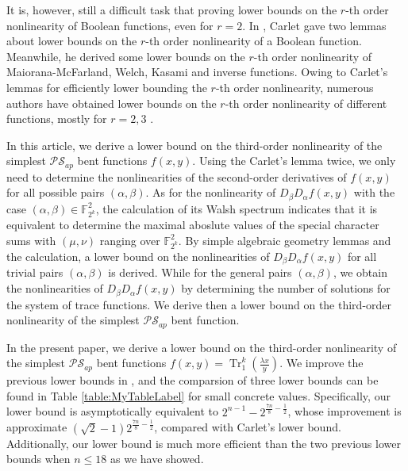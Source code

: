 \documentclass{article}
\newcommand{\F}{\mathbb{F}}
\newcommand{\0}{\textbf{0}}
\newcommand{\1}{\textbf{1}}
\newcommand{\TRACE}{\operatorname{Tr}_1^k}
\theoremstyle{plain}
\begin{document}
    It is, however, still a difficult task that proving lower bounds on the $r$-th order nonlinearity of Boolean functions, even for $r=2$. 
    In \cite{Carlet2008lowbound_NL_profile}, Carlet gave two lemmas about lower bounds on the $r$-th order nonlinearity of a Boolean function. 
    Meanwhile, he derived some lower bounds on the $r$-th order nonlinearity of Maiorana-McFarland, Welch, Kasami and inverse functions. 
    Owing to Carlet's lemmas for efficiently lower bounding the $r$-th order nonlinearity, numerous authors have obtained lower bounds on the $r$-th order nonlinearity of different functions, mostly for $r=2,3$ \cite{YanT2020NL_2,Liu2023NL_2,TangYZZ2020NL_2bent,SihemKJ2020NL_2cubic,SunW2009NL_2,SarkarG2009NL_2MM,GangopadhyayST2010NL_2,GodeG2010NL_3Kasami,SunW2011NL_2,TangCT2013NL_2bent,Singh2014NL_3_biquadratic,GaoT2017NL_2_MM}. 

    In this article, we derive a lower bound on the third-order nonlinearity of the simplest $\mathcal{PS}_{ap}$ bent functions $f(x,y)$.  
    Using the Carlet's lemma twice, we only need to determine the nonlinearities of the second-order derivatives of $f(x,y)$ for all possible pairs $(\alpha,\beta)$. 
    As for the nonlinearity of $D_{\beta}D_{\alpha}f(x,y)$ with the case $(\alpha,\beta)\in\F_{2^k}^2$, the calculation of its Walsh spectrum indicates that it is equivalent to determine the maximal aboslute values of the special character sums with $(\mu,\nu)$ ranging over $\F_{2^k}^2$. 
    By simple algebraic geometry lemmas and the calculation, a lower bound on the nonlinearities of $D_{\beta}D_{\alpha}f(x,y)$ for all trivial pairs $(\alpha,\beta)$ is derived. 
    While for the general pairs $(\alpha,\beta)$, we obtain the nonlinearities of $D_{\beta}D_{\alpha}f(x,y)$ by determining the number of solutions for the system of trace functions. 
    We derive then a lower bound on the third-order nonlinearity of the simplest $\mathcal{PS}_{ap}$ bent function. 

    In the present paper, we derive a lower bound on the third-order nonlinearity of the simplest $\mathcal{PS}_{ap}$ bent functions $f(x,y)=\TRACE\left( \frac{\lambda x}{y} \right)$. 
    We improve the previous lower bounds in \cite{TangCT2013NL_2bent,Carlet2011NL_Profile_Dillon}, and the comparsion of three lower bounds can be found in Table \ref{table:MyTableLabel} for small concrete values. 
    Specifically, our lower bound is asymptotically equivalent to $2^{n-1}-2^{\frac{7n}{8}-\frac{1}{2}}$, whose 
    improvement is approximate $(\sqrt{2}-1)2^{\frac{7n}{8}-\frac{1}{2}}$, compared with Carlet's lower bound. 
    Additionally, our lower bound is much more efficient than the two previous lower bounds when $n\le 18$ as we have showed.  
\end{document}
